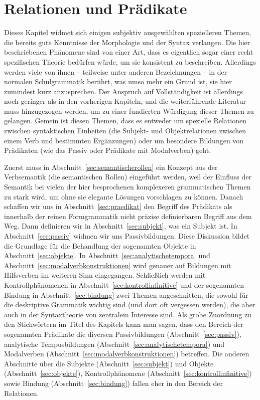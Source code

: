 \chapter{Relationen und Prädikate}

\label{sec:relationenpraedikate}

Dieses Kapitel widmet sich einigen subjektiv ausgewählten spezielleren Themen, die bereits gute Kenntnisse der Morphologie und der Syntax verlangen.
Die hier beschriebenen Phänomene sind von einer Art, dass es eigentlich sogar einer recht spezifischen Theorie bedürfen würde, um sie konsistent zu beschreiben.
Allerdings werden viele von ihnen -- teilweise unter anderen Bezeichnungen -- in der normalen Schulgrammatik berührt, was umso mehr ein Grund ist, sie hier zumindest kurz anzusprechen.
Der Anspruch auf Vollständigkeit ist allerdings noch geringer als in den vorherigen Kapiteln, und die weiterführende Literatur muss hinzugezogen werden, um zu einer fundierten Würdigung dieser Themen zu gelangen.
Gemein ist diesen Themen, dass es entweder um spezielle Relationen zwischen syntaktischen Einheiten (\zB die Subjekt- und Objektrelationen zwischen einem Verb und bestimmten Ergänzungen) oder um besondere Bildungen von Prädikaten (wie \zB das Passiv oder Prädikate mit Modalverben) geht.

Zuerst muss in Abschnitt~\ref{sec:semantischerollen} ein Konzept aus der Verbsemantik (die semantischen Rollen) eingeführt werden, weil der Einfluss der Semantik bei vielen der hier besprochenen komplexeren grammatischen Themen zu stark wird, um ohne sie elegante Lösungen vorschlagen zu können.
Danach schaffen wir uns in Abschnitt~\ref{sec:praedikat} den Begriff des Prädikats als innerhalb der reinen Formgrammatik nicht präzise definierbaren Begriff aus dem Weg.
Dann definieren wir in Abschnitt~\ref{sec:subjekt}, was ein Subjekt ist.
In Abschnitt~\ref{sec:passiv} widmen wir uns Passivbildungen.
Diese Diskussion bildet die Grundlage für die Behandlung der sogenannten Objekte in Abschnitt~\ref{sec:objekte}.
In Abschnitt~\ref{sec:analytischetempora} und Abschnitt~\ref{sec:modalverbkonstruktionen} wird genauer auf Bildungen mit Hilfsverben im weiteren Sinn eingegangen.
Schließlich werden mit Kontrollphänomenen in Abschnitt~\ref{sec:kontrollinfinitive} und der sogenannten Bindung in Abschnitt~\ref{sec:bindung} zwei Themen angeschnitten, die sowohl für die deskriptive Grammatik wichtig sind (und dort oft vergessen werden), die aber auch in der Syntaxtheorie von zentralem Interesse sind.
Als grobe Zuordnung zu den Stichwörtern im Titel des Kapitels kann man sagen, dass den Bereich der sogenannten Prädikate die diversen Passivbildungen (Abschnitt~\ref{sec:passiv}), analytische Tempusbildungen (Abschnitt~\ref{sec:analytischetempora}) und Modalverben (Abschnitt~\ref{sec:modalverbkonstruktionen}) betreffen.
Die anderen Abschnitte über die Subjekte (Abschnitt~\ref{sec:subjekt}) und Objekte (Abschnitt~\ref{sec:objekte}), Kontrollphänomene (Abschnitt~\ref{sec:kontrollinfinitive}) sowie Bindung (Abschnitt~\ref{sec:bindung}) fallen eher in den Bereich der Relationen.


